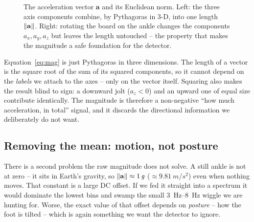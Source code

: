 \begin{figure}[H]
{}
\caption{The acceleration vector $\mathbf{a}$ and its Euclidean norm. Left: the three
axis components combine, by Pythagoras in 3-D, into one length $\lVert \mathbf{a} \rVert$.
Right: rotating the board on the ankle changes the components $a_x,a_y,a_z$ but leaves
the length untouched -- the property that makes the magnitude a safe foundation for the
detector.}
\label{fig:vec3d}
\end{figure}

\begin{mathsbox}
Equation~\eqref{eq:mag} is just Pythagoras in three dimensions. The length of a vector
is the square root of the sum of its squared components, so it cannot depend on the
\emph{labels} we attach to the axes -- only on the vector itself. Squaring also makes
the result blind to sign: a downward jolt ($a_z<0$) and an upward one of equal size
contribute identically. The magnitude is therefore a non-negative ``how much
acceleration, in total'' signal, and it discards the directional information we
deliberately do not want.
\end{mathsbox}

\subsection{Removing the mean: motion, not posture}

There is a second problem the raw magnitude does not solve. A still ankle is not at
zero -- it sits in Earth's gravity, so $\lVert \mathbf{a} \rVert\approx\SI{1}{\textit{g}}$
($\approx\SI{9.81}{m/s^2}$) even when nothing moves. That constant is a large DC
offset. If we fed it straight into a spectrum it would dominate the lowest bins and
swamp the small \SIrange{3}{8}{Hz} wiggle we are hunting for. Worse, the exact value of
that offset depends on \emph{posture} -- how the foot is tilted -- which is again
something we want the detector to ignore.

